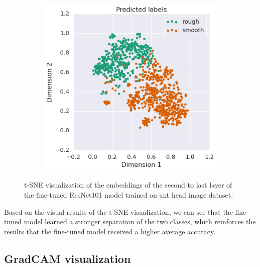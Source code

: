 \documentclass{aci}
\numberwithin{equation}{section}
\begin{document}
\begin{figure}[h]
\begin{subfigure}{.45\textwidth}
        \includegraphics[width=1\linewidth]{thesis_assets/plots/fresnet101_pred_tsne.png}
    \end{subfigure}
    \caption{t-SNE visualization of the embeddings of the second to last layer
        of the fine-tuned ResNet101 model trained on ant head image dataset.}
    \label{fig:fresnet101_tsne}
\end{figure}

\FloatBarrier
Based on the visual results of the t-SNE visualization, we can see that the
fine-tuned model learned a stronger separation of the two classes, which
reinforces the results that the fine-tuned model received a higher average
accuracy.

\FloatBarrier
\subsection{GradCAM visualization}
\end{document}

